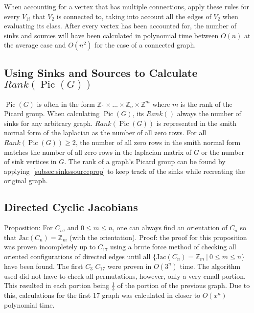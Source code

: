 \documentclass[11pt,reqno]{amsart}
\DeclareMathOperator{\Pic}{Pic}
\newcommand{\Jac}{\textrm{Jac}}{}
\theoremstyle{definition}
\theoremstyle{plain}
\begin{document}
		When accounting for a vertex that has multiple connections, apply these rules for every $V_{1i}$ that $V_2$
		is connected to, taking into account all the edges of $V_2$ when evaluating its class.  After every vertex has
		been accounted for, the number of sinks and sources will have been calculated in polynomial time between $O(n)$
		at the average case and $O(n^2)$ for the case of a connected graph. \label{subsec:sinkssourceprop}
	\subsection{Using Sinks and Sources to Calculate $Rank(\Pic(G))$}
		$\Pic(G)$ is often in the form $\mathbb{Z}_1 \times \dots \times \mathbb{Z}_n \times \mathbb{Z}^m$ where $m$ is
		the rank of the Picard group.  When calculating $\Pic(G)$, its $Rank()$ always the number of sinks for any
		arbitrary graph.  $Rank(\Pic(G))$ is represented in the smith normal form of the laplacian as the number of
		all zero rows.  For all $Rank(\Pic(G)) \geq 2$, the number of all zero rows in the smith normal form matches
		the number of all zero rows in the laplacian matrix of $G$ or the number of sink vertices in $G$.  The rank of a
		graph's Picard group can be found by applying~\ref{subsec:sinkssourceprop} to keep track of the sinks while
		recreating the original graph.
	\subsection{Directed Cyclic Jacobians}
		Proposition: For $C_n$, and $0 \leq m \leq n$, one can always find an orientation of $C_n$ so
		that $\Jac(C_n)=\mathbb{Z}_m$ (with the orientation).
		Proof: the proof for this proposition was proven incompletely up to $C_{17}$ using a brute force method of checking
		all oriented configurations of directed edges until all $\{\Jac(C_n)=\mathbb{Z}_m~|~0 \leq m \leq n\}$ have been found.
		The first $C_3$ $C_{17}$ were proven in $O(3^n)$ time.  The algorithm used did not have to check all permutations, however,
		only a very cmall portion.  This resulted in each portion being $\frac{1}{3}$ of the portion of the previous graph.
		Due to this, calculations for the first 17 graph was calculated in closer to $O(x^n)$ polynomial time.



\end{document}
